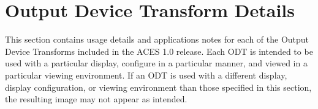 
\chapter{Output Device Transform Details}\label{ch:odt-details}
This section contains usage details and applications notes for each of the Output Device Transforms included in the ACES 1.0 release.  Each ODT is intended to be used with a particular display, configure in a particular manner, and viewed in a particular viewing environment.  If an ODT is used with a different display, display configuration, or viewing environment than those specified in this section, the resulting image may not appear as intended.

\newcommand{\transformID}{\texttt{\seqsplit{ODT.Academy.P3DCI\_48nits.a1.0.3}}}
\newcommand{\shortName}{ACES 1.0 Output - P3-DCI}
\newcommand{\id}{p3dci}

\clearpage

\renewcommand{\transformID}{\texttt{\seqsplit{ODT.Academy.P3D60\_48nits.a1.0.3}}}
\renewcommand{\shortName}{ACES 1.0 Output - P3-D60}
\renewcommand{\id}{p3d60}

\clearpage

\renewcommand{\transformID}{\texttt{\seqsplit{ODT.Academy.DCDM.a1.0.3}}}
\renewcommand{\shortName}{ACES 1.0 Output - DCDM}
\renewcommand{\id}{dcdm}

\clearpage

\renewcommand{\transformID}{\texttt{\seqsplit{ODT.Academy.DCDM\_P3D60.a1.0.3}}}
\renewcommand{\shortName}{ACES 1.0 Output - DCDM (P3 gamut clip)}
\renewcommand{\id}{dcdmP3clip}

\clearpage

\renewcommand{\transformID}{\texttt{\seqsplit{ODT.Academy.Rec709\_D60sim\_100nits\_dim.a1.0.3}}}
\renewcommand{\shortName}{ACES 1.0 Output - Rec.709 (D60 sim.)}
\renewcommand{\id}{rec709_d60sim}

\clearpage

\renewcommand{\transformID}{\texttt{\seqsplit{ODT.Academy.Rec709\_100nits\_dim.a1.0.3}}}
\renewcommand{\shortName}{ACES 1.0 Output - Rec.709}
\renewcommand{\id}{rec709}

\clearpage

\renewcommand{\transformID}{\texttt{\seqsplit{ODT.Academy.Rec2020\_100nits\_dim.a1.0.3}}}
\renewcommand{\shortName}{ACES 1.0 Output - Rec.2020}
\renewcommand{\id}{rec2020_100nit}

\clearpage

